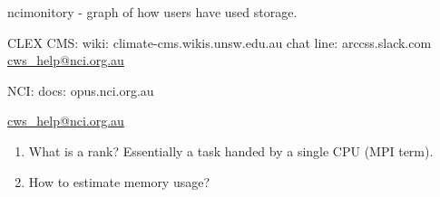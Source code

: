 \documentclass[12pt]{article}
\begin{document}
ncimonitory - graph of how users have used storage. 

CLEX CMS: 
wiki: climate-cms.wikis.unsw.edu.au
chat line: arccss.slack.com
\url{cws_help@nci.org.au}

NCI:
docs: opus.nci.org.au

\url{cws_help@nci.org.au}

\begin{enumerate}
\item
What is a rank? Essentially a task handed by a single CPU (MPI term). 
\item
How to estimate memory usage?
\end{enumerate}
   

\end{document}

